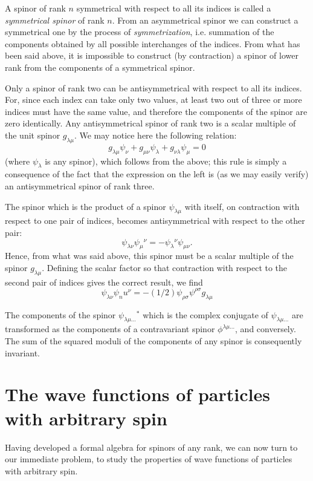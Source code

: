 A spinor of rank $ n $ symmetrical with respect to all its indices is called a \textit{symmetrical spinor} of rank $ n $. From an asymmetrical spinor we can construct a symmetrical one by the process of \textit{symmetrization}, i.e. summation of the components obtained by all possible interchanges of the indices. From what has been said above, it is impossible to construct (by contraction) a spinor of lower rank from the components of a symmetrical spinor.

Only a spinor of rank two can be antisymmetrical with respect to all its indices. For, since each index can take only two values, at least two out of three or more indices must have the same value, and therefore the components of the spinor are zero identically. Any antisymmetrical spinor of rank two is a scalar multiple of the unit spinor $ g_{\lambda\mu} $. We may notice here the following relation:
\begin{equation}\label{56.17}
g_{\lambda\mu}\psi_\nu+g_{\mu\nu}\psi_\lambda+g_{\nu\lambda}\psi_\mu=0
\end{equation}
(where $\psi_\lambda$ is any spinor), which follows from the above; this rule is simply a consequence of the fact that the expression on the left is (as we may easily verify) an antisymmetrical spinor of rank three.

The spinor which is the product of a spinor $\psi_{\lambda\mu}$ with itself, on contraction with respect to one pair of indices, becomes antisymmetrical with respect to the other pair:
\[ \psi_{\lambda\nu}\psi_\mu{}^\nu=-\psi_\lambda{}^\nu\psi_{\mu\nu}. \]
Hence, from what was said above, this spinor must be a scalar multiple of the spinor $ g_{\lambda\mu} $. Defining the scalar factor so that contraction with respect to the second pair of indices gives the correct result, we find
\begin{equation}\label{56.18}
\psi_{\lambda\nu}\psi_nu{}^\nu=-(1/2)\psi_{\rho\sigma}\psi^{\rho\sigma}g_{\lambda\mu}
\end{equation}


The components of the spinor $\psi_{\lambda\mu\dots}{}^*$ which is the complex conjugate of $ \psi_{\lambda\mu\dots} $ are transformed as the components of a contravariant spinor $ \phi^{\lambda\mu\dots} $, and conversely. The sum of the squared moduli of the components of any spinor is consequently invariant.

\section{The wave functions of particles with arbitrary spin}\label{The wave functions of particles with arbitrary spin}
Having developed a formal algebra for spinors of any rank, we can now turn to our immediate problem, to study the properties of wave functions of particles with arbitrary spin.

